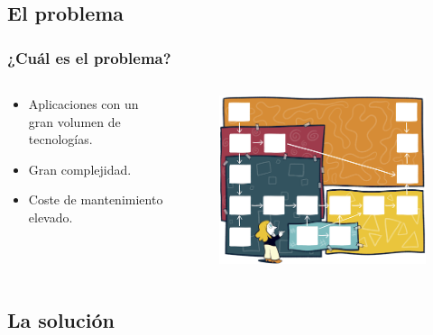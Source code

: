 \documentclass{beamer}
\begin{document}
\subsection{El problema}
\begin{frame}
    \frametitle{¿Cuál es el problema?}
    \begin{columns}
        \begin{column}{0.45\textwidth}
            \begin{itemize}
                \item<1-> Aplicaciones con un gran volumen de tecnologías.
                \item<2-> Gran complejidad.
                \item<3-> Coste de mantenimiento elevado.
            \end{itemize}
        \end{column}
        \begin{column}{0.55\textwidth}
            \begin{figure}
                \includegraphics[scale=0.33]{figuras/complejidad}
            \end{figure}
        \end{column}
    \end{columns}
\end{frame}

\subsection{La solución}
\end{document}
